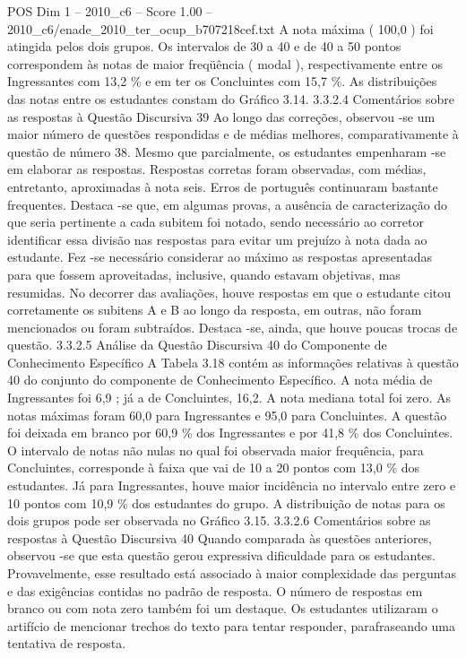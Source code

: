\begin{textsample}{POS Dim 1 – 2010\_c6 – Score 1.00 – 2010\_c6/enade\_2010\_ter\_ocup\_b707218cef.txt}
A nota máxima ( 100,0 ) foi atingida pelos dois grupos.
Os intervalos de 30 a 40 e de 40 a 50 pontos correspondem às notas de maior freqüência ( modal ), respectivamente entre os Ingressantes com 13,2 \% e em ter os Concluintes com 15,7 \%.
As distribuições das notas entre os estudantes constam do Gráfico 3.14. 3.3.2.4 Comentários sobre as respostas à Questão Discursiva 39 Ao longo das correções, observou -se um maior número de questões respondidas e de médias melhores, comparativamente à questão de número 38.
Mesmo que parcialmente, os estudantes empenharam -se em elaborar as respostas.
Respostas corretas foram observadas, com médias, entretanto, aproximadas à nota seis.
Erros de português continuaram bastante frequentes.
Destaca -se que, em algumas provas, a ausência de caracterização do que seria pertinente a cada subitem foi notado, sendo necessário ao corretor identificar essa divisão nas respostas para evitar um prejuízo à nota dada ao estudante.
Fez -se necessário considerar ao máximo as respostas apresentadas para que fossem aproveitadas, inclusive, quando estavam objetivas, mas resumidas.
No decorrer das avaliações, houve respostas em que o estudante citou corretamente os subitens A e B ao longo da resposta, em outras, não foram mencionados ou foram subtraídos.
Destaca -se, ainda, que houve poucas trocas de questão. 3.3.2.5 Análise da Questão Discursiva 40 do Componente de Conhecimento Específico A Tabela 3.18 contém as informações relativas à questão 40 do conjunto do componente de Conhecimento Específico.
A nota média de Ingressantes foi 6,9 ; já a de Concluintes, 16,2.
A nota mediana total foi zero.
As notas máximas foram 60,0 para Ingressantes e 95,0 para Concluintes.
A questão foi deixada em branco por 60,9 \% dos Ingressantes e por 41,8 \% dos Concluintes.
O intervalo de notas não nulas no qual foi observada maior frequência, para Concluintes, corresponde à faixa que vai de 10 a 20 pontos com 13,0 \% dos estudantes.
Já para Ingressantes, houve maior incidência no intervalo entre zero e 10 pontos com 10,9 \% dos estudantes do grupo.
A distribuição de notas para os dois grupos pode ser observada no Gráfico 3.15. 3.3.2.6 Comentários sobre as respostas à Questão Discursiva 40 Quando comparada às questões anteriores, observou -se que esta questão gerou expressiva dificuldade para os estudantes.
Provavelmente, esse resultado está associado à maior complexidade das perguntas e das exigências contidas no padrão de resposta.
O número de respostas em branco ou com nota zero também foi um destaque.
Os estudantes utilizaram o artifício de mencionar trechos do texto para tentar responder, parafraseando uma tentativa de resposta.

\end{textsample}

